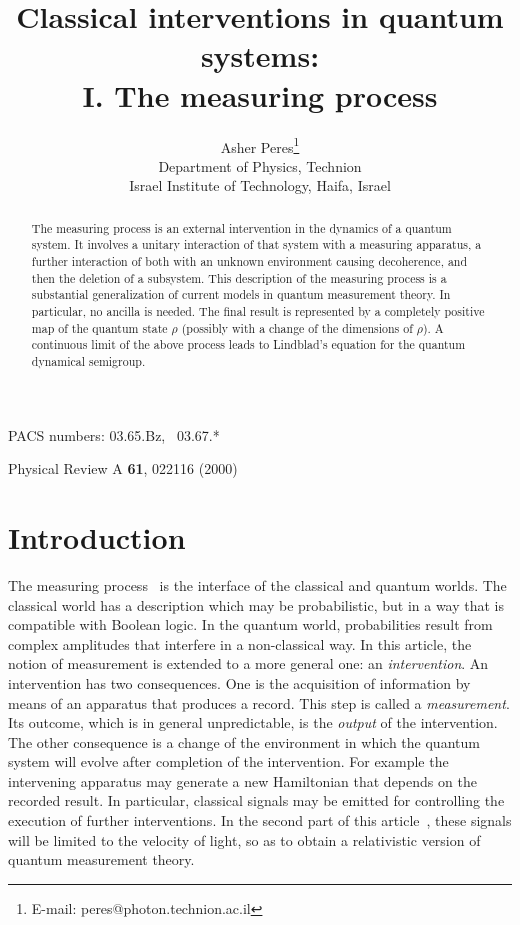 \documentclass[12pt]{article}
\begin{document}
\renewcommand{\thefootnote}{\fnsymbol{footnote}}

\title{Classical interventions in quantum systems:\\ 
I. The measuring process}

\author{Asher Peres\footnote{E-mail: peres@photon.technion.ac.il} \\
Department of Physics, Technion\\
Israel Institute of Technology, Haifa, Israel}

\maketitle

\begin{abstract}
The measuring process is an external intervention in the dynamics of a
quantum system. It involves a unitary interaction of that system with a
measuring apparatus, a further interaction of both with an unknown
environment causing decoherence, and then the deletion of a subsystem.
This description of the measuring process is a substantial
generalization of current models in quantum measurement theory. In
particular, no ancilla is needed. The final result is represented by a
completely positive map of the quantum state $\rho$ (possibly with a
change of the dimensions of $\rho$). A continuous limit of the above
process leads to Lindblad's equation for the quantum dynamical
semigroup.
\end{abstract}

\medskip

\noindent PACS numbers: 03.65.Bz, \ 03.67.* \vfill

\noindent Physical Review A {\bf61}, 022116 (2000) \vfill

\section{Introduction}

The measuring process~\cite{vN,WZ} is the interface of the classical and
quantum worlds. The classical world has a description which may be
probabilistic, but in a way that is compatible with Boolean logic. In
the quantum world, probabilities result from complex amplitudes that
interfere in a non-classical way. In this article, the notion of
measurement is extended to a more general one: an {\it intervention\/}.
An intervention has two consequences. One is the acquisition of
information by means of an apparatus that produces a record. This step
is called a {\it measurement\/}. Its outcome, which is in general
unpredictable, is the {\it output\/} of the intervention. The other
consequence is a change of the environment in which the quantum system
will evolve after completion of the intervention. For example the
intervening apparatus may generate a new Hamiltonian that depends on the
recorded result. In particular, classical signals may be emitted for
controlling the execution of further interventions. In the second part
of this article~\cite{II}, these signals will be limited to the velocity
of light, so as to obtain a relativistic version of quantum measurement
theory.
\end{document}
